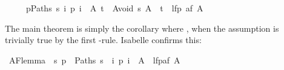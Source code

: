 \begin{isabellebody}
\begin{isamarkuptext}
\begin{isabelle}
\ \ \ \ \ {\isasymlbrakk}{\isasymforall}p{\isasymin}Paths\ s{\isachardot}\ {\isasymexists}i{\isachardot}\ p\ i\ {\isasymin}\ A{\isacharsemicolon}\ t\ {\isasymin}\ Avoid\ s\ A{\isasymrbrakk}\ {\isasymLongrightarrow}\ t\ {\isasymin}\ lfp\ {\isacharparenleft}af\ A{\isacharparenright}%
\end{isabelle}
The main theorem is simply the corollary where ,
when the assumption  is trivially true
by the first -rule. Isabelle confirms this:%
%
\end{isamarkuptext}%
\isamarkuptrue%
\ AF{\isacharunderscore}lemma{}{\isacharcolon}\ \ {\isachardoublequote}{\isacharbraceleft}s{\isachardot}\ {\isasymforall}p\ {\isasymin}\ Paths\ s{\isachardot}\ {\isasymexists}\ i{\isachardot}\ p\ i\ {\isasymin}\ A{\isacharbraceright}\ {\isasymsubseteq}\ lfp{\isacharparenleft}af\ A{\isacharparenright}{\isachardoublequote}\isanewline
\isamarkupfalse%
\isanewline
\isanewline
\isamarkupfalse%
\isamarkupfalse%
\end{isabellebody}%
